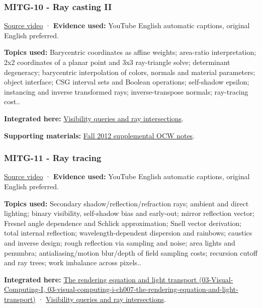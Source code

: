 \subsubsection{MITG-10 - Ray casting II}\label{04-visual-computing-ii-ch036-mitg-10---ray-casting-ii}

\href{https://www.youtube.com/watch?v=gDayCevuE-U}{Source video} · \textbf{Evidence used:} YouTube English automatic captions, original English preferred.

\textbf{Topics used:} Barycentric coordinates as affine weights; area-ratio interpretation; 2x2 coordinates of a planar point and 3x3 ray-triangle solve; determinant degeneracy; barycentric interpolation of colors, normals and material parameters; object interface; CSG interval sets and Boolean operations; self-shadow epsilon; instancing and inverse transformed rays; inverse-transpose normals; ray-tracing cost..

\textbf{Integrated here:} \hyperref[04-visual-computing-ii-ch028-visibility-queries-and-ray-intersections-1]{Visibility queries and ray intersections}.

\textbf{Supporting materials:} \href{https://ocw.mit.edu/courses/6-837-computer-graphics-fall-2012/pages/lecture-notes/}{Fall 2012 supplemental OCW notes}.

\subsubsection{MITG-11 - Ray tracing}\label{04-visual-computing-ii-ch036-mitg-11---ray-tracing}

\href{https://www.youtube.com/watch?v=UL54Rf2O9RM}{Source video} · \textbf{Evidence used:} YouTube English automatic captions, original English preferred.

\textbf{Topics used:} Secondary shadow/reflection/refraction rays; ambient and direct lighting; binary visibility, self-shadow bias and early-out; mirror reflection vector; Fresnel angle dependence and Schlick approximation; Snell vector derivation; total internal reflection; wavelength-dependent dispersion and rainbows; caustics and inverse design; rough reflection via sampling and noise; area lights and penumbra; antialiasing/motion blur/depth of field sampling costs; recursion cutoff and ray trees; work imbalance across pixels..

\textbf{Integrated here:} \href{../03-Visual-Computing-I/main.pdf\#nameddest=03-visual-computing-i-ch007-the-rendering-equation-and-light-transport}{The rendering equation and light transport (03-Visual-Computing-I, 03-visual-computing-i-ch007-the-rendering-equation-and-light-transport)} · \hyperref[04-visual-computing-ii-ch028-visibility-queries-and-ray-intersections-1]{Visibility queries and ray intersections}.

